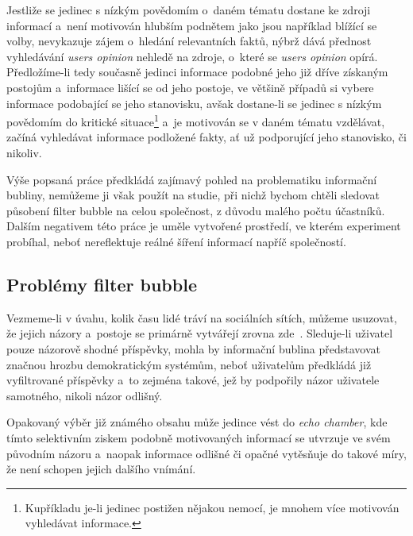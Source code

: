 \documentclass[12pt, a4paper]{article}
\numberwithin{equation}{section} 	%
\begin{document}
Jestliže se jedinec s nízkým povědomím o~daném tématu dostane ke zdroji informací a~není motivován hlubším podnětem jako jsou například blížící se volby, nevykazuje zájem o~hledání relevantních faktů, nýbrž dává přednost vyhledávání \textit{users opinion} nehledě na zdroje, o~které se \textit{users opinion} opírá. Předložíme-li tedy současně jedinci informace podobné jeho již dříve získaným postojům a~informace lišící se od jeho postoje, ve většině případů si vybere informace podobající se jeho stanovisku, avšak dostane-li se jedinec s nízkým povědomím do kritické situace\footnote{Kupříkladu je-li jedinec postižen nějakou nemocí, je mnohem více motivován vyhledávat informace.} a~je motivován se v daném tématu vzdělávat, začíná vyhledávat informace podložené fakty, ať už podporující jeho stanovisko, či nikoliv.

Výše popsaná práce předkládá zajímavý pohled na problematiku informační bubliny, nemůžeme ji však použít na studie, při nichž bychom chtěli sledovat působení filter bubble na celou společnost, z důvodu malého počtu účastníků. Dalším negativem této práce je uměle vytvořené prostředí, ve kterém experiment probíhal, neboť nereflektuje reálné šíření informací napříč společností.

\subsection{Problémy filter bubble}
Vezmeme-li v úvahu, kolik času lidé tráví na sociálních sítích, můžeme usuzovat, že jejich názory a~postoje se primárně vytvářejí zrovna zde~\cite{TheImpactOfFilterBubble, BeyondFilterBubble, whyNewsOnTwitter}. Sleduje-li uživatel pouze názorově shodné příspěvky, mohla by informační bublina před\-sta\-vo\-vat značnou hrozbu demokratickým systémům, neboť uživatelům předkládá již vyfiltrované příspěvky a~to zejména takové, jež by podpořily názor uživatele samotného, nikoli názor odlišný.

Opakovaný výběr již známého obsahu může jedince vést do \textit{echo chamber}, kde tímto selektivním ziskem podobně motivovaných informací se utvrzuje ve svém původním názoru a~naopak informace odlišné či opačné vytěsňuje do takové míry, že není schopen jejich dalšího vnímání.
\end{document}
